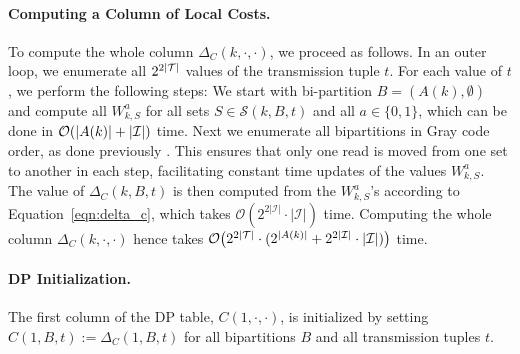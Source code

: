 \paragraph{Computing a Column of Local Costs.}
To compute the whole column $\Delta_C(k,\cdot,\cdot)$, we proceed as follows.
In an outer loop, we enumerate all $2^{2{\left\lvert \mathcal{T} \right\rvert}}$ values of the transmission tuple $t$.
For each value of $t$, we perform the following steps:
We start with bi-partition $B=(A(k),\emptyset)$ and compute all $W_{k,S}^a$ for all sets $S\in\mathcal{S}(k,B,t)$ and all $a\in\{0,1\}$, which can be done in $\mathcal{O}({\left\lvert A(k) \right\rvert}+|\mathcal{I}|)$ time.
Next we enumerate all bipartitions in Gray code order, as done previously \citep{Patterson2015}.
This ensures that only one read is moved from one set to another in each step, facilitating constant time updates of the values $W_{k,S}^a$.
The value of $\Delta_C(k,B,t)$ is then computed from the $W_{k,S}^a$'s according to Equation~\eqref{eqn:delta_c}, which takes $\mathcal{O}(2^{2|\mathcal{I}|}\cdot |\mathcal{I}|)$ time.
Computing the whole column $\Delta_C(k,\cdot,\cdot)$ hence takes 
$\mathcal{O}\big(2^{2{\left\lvert \mathcal{T} \right\rvert}}\cdot(2^{|A(k)|} +  2^{2|\mathcal{I}|}\cdot |\mathcal{I}|)\big)$
time.

\paragraph{DP Initialization.}
The first column of the DP table, $C(1,\cdot,\cdot)$, is initialized by setting $C(1,B,t):=\Delta_C(1,B,t)$ for all bipartitions $B$ and all transmission tuples $t$.

